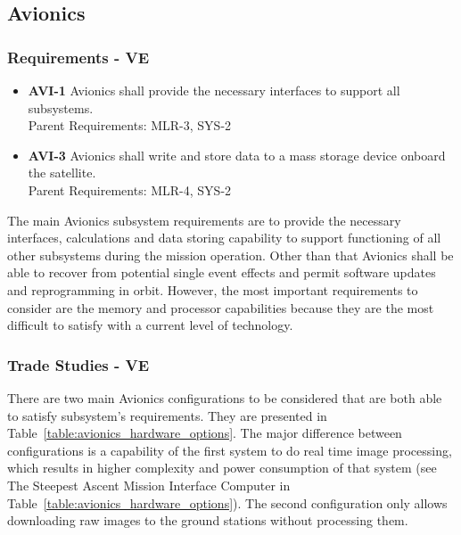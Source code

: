 \documentclass[12pt]{article}
\begin{document}
\subsection{Avionics}

\subsubsection{Requirements - VE}
\begin{itemize}
\item \textbf{AVI-1} Avionics shall provide the necessary interfaces to support all subsystems.\\
Parent Requirements: MLR-3, SYS-2
\item \textbf{AVI-3} Avionics shall write and store data to a mass storage device onboard the satellite.\\
Parent Requirements: MLR-4, SYS-2
\end{itemize}
The main Avionics subsystem requirements are to provide the necessary interfaces, calculations and data storing capability to support functioning of all other subsystems during the mission operation. Other than that Avionics shall be able to recover from potential single event effects and permit software updates and reprogramming in orbit.
However, the most important requirements to consider are the memory and processor capabilities because they are the most difficult to satisfy with a current level of technology.

			\subsubsection{Trade Studies - VE}
There are two main Avionics configurations to be considered that are both able to satisfy subsystem’s requirements. They are presented in Table~\ref{table:avionics_hardware_options}. The major difference between configurations is a capability of the first system to do real time image processing, which results in higher complexity and power consumption of that system (see The Steepest Ascent Mission Interface Computer in Table~\ref{table:avionics_hardware_options}). The second configuration only allows downloading raw images to the ground stations without processing them.
\end{document}
